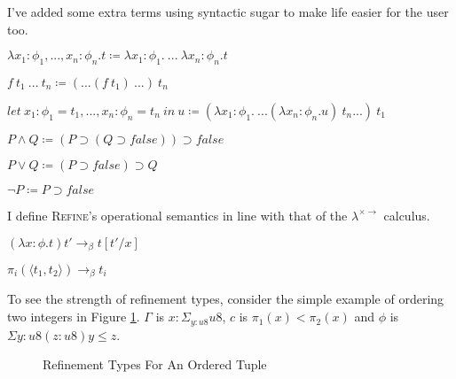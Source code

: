 I've added some extra terms using syntactic sugar to make life easier for the user too.

\begin{center}
    $\lambda x_1: \phi_1, ..., x_n: \phi_n . t \coloneqq \lambda x_1: \phi_1 .\ ...\ \lambda x_n: \phi_n . t$

    $f\ t_1\ ...\ t_n \coloneqq (...(f\ t_1)\ ...)\ t_n$

    $let\ x_1: \phi_1 = t_1, ..., x_n: \phi_n = t_n\ in\ u \coloneqq (\lambda x_1: \phi_1 .\ ...(\lambda x_n: \phi_n . u)\ t_n...)\ t_1$

    $P \land Q \coloneqq (P \supset (Q \supset false)) \supset false$

    $P \lor Q \coloneqq (P \supset false) \supset Q$

    $\lnot P \coloneqq P \supset false$
\end{center}

I define \textsc{Refine}'s operational semantics in line with that of the $\lambda^{\times \rightarrow}$ calculus.

\begin{center}
    $(\lambda x: \phi . t) t' \rightarrow_\beta t[t'/x]$

    $\pi_i(\langle t_1, t_2 \rangle) \rightarrow_\beta t_i$
\end{center}

To see the strength of refinement types, consider the simple example of ordering two integers in
Figure \ref{fig:refinement_ordering}.
$\Gamma$ is $x: \Sigma_{y:u8} u8$, $c$ is $\pi_1(x) < \pi_2(x)$ and $\phi$ is $\Sigma{y:u8} (z:u8) y \leq z$.

\begin{figure}
    \centering
    \begin{prooftree}[separation=0.5em]
    \end{prooftree}
    \caption{Refinement Types For An Ordered Tuple}
    \label{fig:refinement_ordering}
\end{figure}


